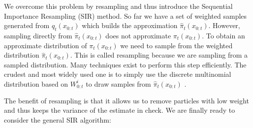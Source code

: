 We overcome this problem by resampling and thus introduce the Sequential Importance Resampling (SIR) method. So far we have a set of weighted samples generated from $q_t(x_{0:t})$ which builds the approximation $\hat{\pi}_t(x_{0:t})$. However, sampling directly from $\hat{\pi}_t(x_{0:t})$ does not approximate $\pi_t(x_{0:t})$. To obtain an approximate distribution of $\pi_t(x_{0:t})$ we need to sample from the weighted distribution $\hat{\pi}_t(x_{0:t})$. This is called resampling because we are sampling from a sampled distribution. Many techniques exist to perform this step efficiently. The crudest and most widely used one is to simply use the discrete multinomial distribution based on $W^i_{0:t}$ to draw samples from $\hat{\pi}_t(x_{0:t})$ \cite{pftut}. 

The benefit of resampling is that it allows us to remove particles with low weight and thus keeps the variance of the estimate in check. We are finally ready to consider the general SIR  algorithm:

